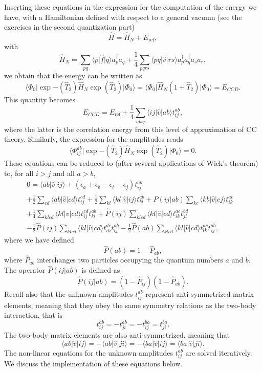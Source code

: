 Inserting these equations in the expression for the computation of the
energy we have, with a Hamiltonian defined with respect to a general
vacuum (see the exercises in the second quantization part)
\[
\hat{H}=\hat{H}_N+E_{\mathrm{ref}},
\]
with 
\[
\hat{H}_N=\sum_{pq}\langle p \vert \hat{f} \vert q \rangle  a^{\dagger}_pa_q + \frac{1}{4}\sum_{pqrs}\langle pq \vert \hat{v} \vert rs \rangle a^{\dagger}_pa^{\dagger}_qa_sa_r,
\]
we obtain that the energy can be written as 
\[
\langle \Phi_0 \vert \exp{-\left(\hat{T}_2\right)}\hat{H}_N\exp{\left(\hat{T}_2\right)}\vert \Phi_0\rangle =
\langle \Phi_0 \vert \hat{H}_N(1+\hat{T}_2)\vert \Phi_0\rangle = E_{CCD}.
\]
This quantity becomes 
\[
E_{CCD}=E_{\mathrm{ref}}+\frac{1}{4}\sum_{abij}\langle ij \vert \hat{v} \vert ab \rangle t_{ij}^{ab},
\]
where the latter is the correlation energy from this level of approximation of CC theory. 
Similarly, the expression for the amplitudes reads
\[
\langle \Phi_{ij}^{ab} \vert \exp{-\left(\hat{T}_2\right)}\hat{H}_N\exp{\left(\hat{T}_2\right)}\vert \Phi_0\rangle = 0.
\]
These equations can be reduced to (after several applications of Wick's theorem) to, for all $i > j$ and all $a  > b$,
\begin{align}
0 = \langle ab \vert \hat{v} \vert ij \rangle + \left(\epsilon_a+\epsilon_b-\epsilon_i-\epsilon_j\right)t_{ij}^{ab} & \nonumber \\ 
+\frac{1}{2}\sum_{cd} \langle ab \vert \hat{v} \vert cd \rangle t_{ij}^{cd}+\frac{1}{2}\sum_{kl} \langle kl \vert \hat{v} \vert ij \rangle t_{kl}^{ab}+\hat{P}(ij\vert ab)\sum_{kc} \langle kb \vert \hat{v} \vert cj \rangle t_{ik}^{ac} & \nonumber \\
+\frac{1}{4}\sum_{klcd} \langle kl \vert \hat{v} \vert cd \rangle t_{ij}^{cd}t_{kl}^{ab}+\hat{P}(ij)\sum_{klcd} \langle kl \vert \hat{v} \vert cd \rangle t_{ik}^{ac}t_{jl}^{bd}& \nonumber \\
-\frac{1}{2}\hat{P}(ij)\sum_{klcd} \langle kl \vert \hat{v} \vert cd \rangle t_{ik}^{dc}t_{lj}^{ab}-\frac{1}{2}\hat{P}(ab)\sum_{klcd} \langle kl \vert \hat{v} \vert cd \rangle t_{lk}^{ac}t_{ij}^{db},&
\label{eq:ccd}
\end{align}
where we have defined 
\[
\hat{P}\left(ab\right)= 1-\hat{P}_{ab},
\]
where $\hat{P}_{ab}$ interchanges two particles occupying the quantum numbers $a$ and $b$. 
The operator $\hat{P}(ij\vert ab)$  is defined as
\[
\hat{P}(ij\vert ab) = (1-\hat{P}_{ij})(1-\hat{P}_{ab}).
\]
Recall also that the unknown amplitudes $t_{ij}^{ab}$
represent anti-symmetrized matrix elements, meaning that they obey the same symmetry relations as the two-body interaction, that is
\[
t_{ij}^{ab}=-t_{ji}^{ab}=-t_{ij}^{ba}=t_{ji}^{ba}.
\]
The two-body matrix elements are also anti-symmetrized, meaning that
\[
\langle ab \vert \hat{v} \vert ij \rangle = -\langle ab \vert \hat{v} \vert ji \rangle= -\langle ba \vert \hat{v} \vert ij \rangle=\langle ba \vert \hat{v} \vert ji \rangle.
\]
The non-linear equations for the unknown amplitudes  $t_{ij}^{ab}$ are solved iteratively. We discuss the implementation of these equations below.

